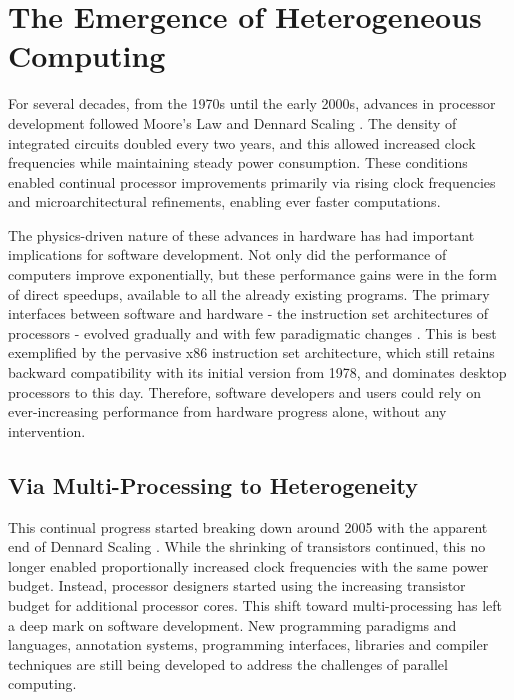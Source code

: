 \section{The Emergence of Heterogeneous Computing}

    For several decades, from the 1970s until the early 2000s, advances in
    processor development followed Moore's Law \citep{4785860} and
    Dennard Scaling \citep{1050511}.
    The density of integrated circuits doubled every two years,
    and this allowed increased clock frequencies while maintaining
    steady power consumption.
    These conditions enabled continual processor improvements
    primarily via rising clock frequencies and microarchitectural refinements,
    enabling ever faster computations.

    The physics-driven nature \citep{Hutcheson2018Moore} of these advances in
    hardware has had important implications for software development.
    Not only did the performance of computers improve exponentially, but these
    performance gains were in the form of direct speedups, available to all the
    already existing programs.
    The primary interfaces between software and hardware - the instruction set
    architectures of processors - evolved gradually and with few
    paradigmatic changes \citep{8310168}.
    This is best exemplified by the pervasive x86 instruction set architecture,
    which still retains backward compatibility with its initial version from
    1978, and dominates desktop processors to this day.
    Therefore, software developers and users could rely on ever-increasing
    performance from hardware progress alone, without any intervention.

\subsection{Via Multi-Processing to Heterogeneity}

    This continual progress started breaking down around 2005 with the apparent
    end of Dennard Scaling \citep{6307773}.
    While the shrinking of transistors continued, this no longer enabled
    proportionally increased clock frequencies with the same power budget.
    Instead, processor designers started using the increasing transistor
    budget for additional processor cores.
    This shift toward multi-processing has left a deep mark on software
    development.
    New programming paradigms and languages, annotation systems, programming
    interfaces, libraries and compiler techniques are still being developed to
    address the challenges of parallel computing.

